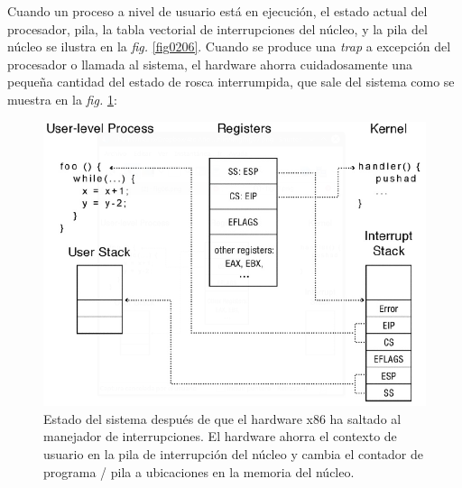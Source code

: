 \documentclass[10pt]{book}
\begin{document}
Cuando un proceso a nivel de usuario está en ejecución, el estado actual del procesador, pila, la tabla vectorial de interrupciones del núcleo, y la pila del núcleo se ilustra en la \textit{fig.} \ref{fig0206}. Cuando se produce una \textit{trap} a excepción del procesador o llamada al sistema, el hardware ahorra cuidadosamente una pequeña cantidad del estado de rosca interrumpida, que sale del sistema como se muestra en la \textit{fig.} \ref{fig0207}:

\begin{figure}[tbhp]
\centerline{\includegraphics[scale=0.55]{img/fig0207}}
\caption{Estado del sistema después de que el hardware x$86$ ha saltado al manejador de interrupciones. El hardware ahorra el contexto de usuario en la pila de interrupción del núcleo y cambia el contador de programa / pila a ubicaciones en la memoria del núcleo.}
\label{fig0207}
\end{figure}
\end{document}
